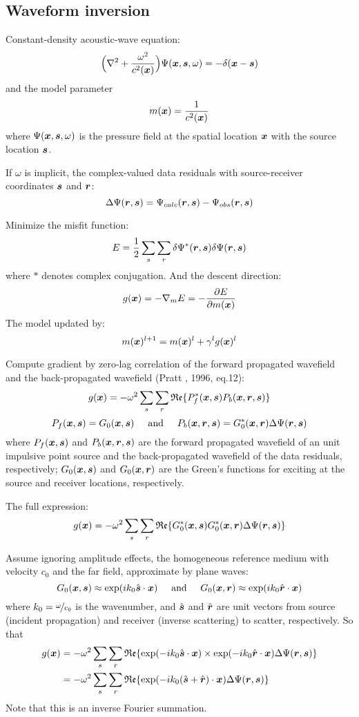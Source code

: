 \subsection{Waveform inversion}
Constant-density acoustic-wave equation:
\[ \Big(\nabla^2+\frac{\omega^2}{c^2(\boldsymbol{x})}\Big)\Psi(\boldsymbol{x},\boldsymbol{s},\omega)=-\delta(\boldsymbol{x}-\boldsymbol{s}) \]
and the model parameter
\[ m(\boldsymbol{x})=\frac{1}{c^2(\boldsymbol{x})} \]
where $\Psi(\boldsymbol{x},\boldsymbol{s},\omega)$ is the pressure field
at the spatial location $\boldsymbol{x}$ with the source location $\boldsymbol{s}$.

If $\omega$ is implicit, the complex-valued data residuals
with source-receiver coordinates $\boldsymbol{s}$ and $\boldsymbol{r}$:
\[ \Delta\Psi(\boldsymbol{r},\boldsymbol{s})=\Psi_{calc}(\boldsymbol{r},\boldsymbol{s})-\Psi_{obs}(\boldsymbol{r},\boldsymbol{s}) \]

Minimize the misfit function:
\[ E=\frac{1}{2}\sum_s\sum_r\delta\Psi^*(\boldsymbol{r},\boldsymbol{s})\delta\Psi(\boldsymbol{r},\boldsymbol{s}) \]
where $*$ denotes complex conjugation. And the descent direction:
\[ g(\boldsymbol{x})=-\nabla_m E=-\frac{\partial E}{\partial m(\boldsymbol{x})} \]
The model updated by:
\[ m(\boldsymbol{x})^{l+1}=m(\boldsymbol{x})^l+\gamma^lg(\boldsymbol{x})^l \]

Compute gradient by zero-lag correlation
of the forward propagated wavefield and the back-propagated wavefield (Pratt \etal, 1996, eq.12):
\[ g(\boldsymbol{x})=-\omega^2\sum_s\sum_r\mathfrak{Re}\{P_f^*(\boldsymbol{x},\boldsymbol{s})P_b(\boldsymbol{x},\boldsymbol{r},\boldsymbol{s})\} \]
\[ P_f(\boldsymbol{x},\boldsymbol{s})=G_0(\boldsymbol{x},\boldsymbol{s}) \text{\hspace{5mm}and\hspace{5mm}} P_b(\boldsymbol{x},\boldsymbol{r},\boldsymbol{s})=G_0^*(\boldsymbol{x},\boldsymbol{r})\Delta\Psi(\boldsymbol{r},\boldsymbol{s}) \]
where $P_f(\boldsymbol{x},\boldsymbol{s})$ and $P_b(\boldsymbol{x},\boldsymbol{r},\boldsymbol{s})$
are the forward propagated wavefield of an unit impulsive point source
and the back-propagated wavefield of the data residuals, respectively;
$G_0(\boldsymbol{x},\boldsymbol{s})$ and $G_0(\boldsymbol{x},\boldsymbol{r})$ are the Green's functions
for exciting at the source and receiver locations, respectively.

The full expression:
\[ g(\boldsymbol{x})=-\omega^2\sum_s\sum_r\mathfrak{Re}\{G_0^*(\boldsymbol{x},\boldsymbol{s})G_0^*(\boldsymbol{x},\boldsymbol{r})\Delta\Psi(\boldsymbol{r},\boldsymbol{s})\} \]

Assume ignoring amplitude effects,
the homogeneous reference medium with velocity $c_0$ and the far field, approximate by plane waves:
\[ G_0(\boldsymbol{x},\boldsymbol{s})\approx\exp(ik_0\hat{\boldsymbol{s}}\cdot\boldsymbol{x}) \text{\hspace{5mm}and\hspace{5mm}} G_0(\boldsymbol{x},\boldsymbol{r})\approx\exp(ik_0\hat{\boldsymbol{r}}\cdot\boldsymbol{x}) \]
where $k_0=\nicefrac{\omega}{c_0}$ is the wavenumber,
and $\hat{\boldsymbol{s}}$ and $\hat{\boldsymbol{r}}$ are unit vectors
from source (incident propagation) and receiver (inverse scattering) to scatter, respectively.
So that
\begin{align*}
g(\boldsymbol{x}) & =-\omega^2\sum_s\sum_r\mathfrak{Re}\{\exp(-ik_0\hat{\boldsymbol{s}}\cdot\boldsymbol{x})\times\exp(-ik_0\hat{\boldsymbol{r}}\cdot\boldsymbol{x})\Delta\Psi(\boldsymbol{r},\boldsymbol{s})\} \\
          & =-\omega^2\sum_s\sum_r\mathfrak{Re}\{\exp(-ik_0(\hat{\boldsymbol{s}}+\hat{\boldsymbol{r}})\cdot\boldsymbol{x})\Delta\Psi(\boldsymbol{r},\boldsymbol{s})\}
\end{align*}
Note that this is an inverse Fourier summation.


